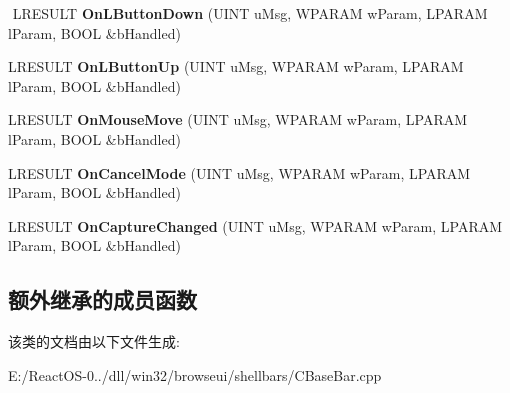\begin{DoxyCompactItemize}
$$\mbox{\label{class_c_base_bar_a24e42d0bf05e7d9fd8ce0f64e0656686}} 
L\+R\+E\+S\+U\+LT {\bfseries On\+L\+Button\+Down} (U\+I\+NT u\+Msg, W\+P\+A\+R\+AM w\+Param, L\+P\+A\+R\+AM l\+Param, B\+O\+OL \&b\+Handled)
\item 
\mbox{\label{class_c_base_bar_a69b54352792096976327dc1a6e037fff}} 
L\+R\+E\+S\+U\+LT {\bfseries On\+L\+Button\+Up} (U\+I\+NT u\+Msg, W\+P\+A\+R\+AM w\+Param, L\+P\+A\+R\+AM l\+Param, B\+O\+OL \&b\+Handled)
\item 
\mbox{\label{class_c_base_bar_a470460ca1a55a063df27b865bc0e6168}} 
L\+R\+E\+S\+U\+LT {\bfseries On\+Mouse\+Move} (U\+I\+NT u\+Msg, W\+P\+A\+R\+AM w\+Param, L\+P\+A\+R\+AM l\+Param, B\+O\+OL \&b\+Handled)
\item 
\mbox{\label{class_c_base_bar_a18f6532b00608b748787af7aceff5008}} 
L\+R\+E\+S\+U\+LT {\bfseries On\+Cancel\+Mode} (U\+I\+NT u\+Msg, W\+P\+A\+R\+AM w\+Param, L\+P\+A\+R\+AM l\+Param, B\+O\+OL \&b\+Handled)
\item 
\mbox{\label{class_c_base_bar_aff5d73ac1d222af9e2a4e24ff01f4c46}} 
L\+R\+E\+S\+U\+LT {\bfseries On\+Capture\+Changed} (U\+I\+NT u\+Msg, W\+P\+A\+R\+AM w\+Param, L\+P\+A\+R\+AM l\+Param, B\+O\+OL \&b\+Handled)
\end{DoxyCompactItemize}
\subsection*{额外继承的成员函数}


该类的文档由以下文件生成\+:\begin{DoxyCompactItemize}
\item 
E\+:/\+React\+O\+S-\/0../dll/win32/browseui/shellbars/C\+Base\+Bar.\+cpp\end{DoxyCompactItemize}
